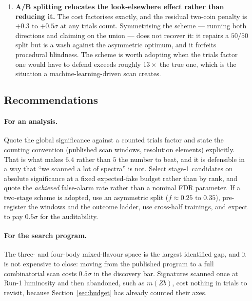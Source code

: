 \begin{enumerate}[leftmargin=1.6em,itemsep=4pt]
        argument gets stronger, not weaker: the threshold's margin grows to more than ten
        percentage points and the argmax loses control of its false-alarm rate entirely.
  \item \textbf{A/B splitting relocates the look-elsewhere effect rather than reducing it.} The cost
factorises exactly, and the residual two-coin penalty is $+0.3$ to $+0.5\sigma$ at any trials
count. Symmetrising the scheme --- running both directions and claiming on the union --- does not
recover it: it repairs a $50/50$ split but is a wash against the asymmetric optimum, and it
forfeits procedural blindness. The scheme is worth adopting when the trials factor one would have
to defend exceeds roughly $13\times$ the true one, which is the situation a machine-learning-driven
scan creates.
\end{enumerate}

\subsection{Recommendations}

\paragraph{For an analysis.} Quote the global significance against a counted trials factor and
state the counting convention (published scan windows, resolution elements) explicitly. That is
what makes $6.4$ rather than $5$ the number to beat, and it is defensible in a way that ``we
scanned a lot of spectra'' is not. Select stage-1 candidates on absolute significance at a fixed
expected-fake budget rather than by rank, and quote the \emph{achieved} false-alarm rate rather than
a nominal FDR parameter. If a two-stage scheme is adopted, use an asymmetric split
($f \approx 0.25$ to $0.35$), pre-register the windows and the outcome ladder, use cross-half
trainings, and expect to pay $0.5\sigma$ for the auditability.

\paragraph{For the search program.} The three- and four-body mixed-flavour space is the largest
identified gap, and it is not expensive to close: moving from the published program to a full
combinatorial scan costs $0.5\sigma$ in the discovery bar. Signatures scanned once at Run-1
luminosity and then abandoned, such as $m(Zb)$, cost nothing in trials to revisit, because
Section~\ref{sec:budget} has already counted their axes.

